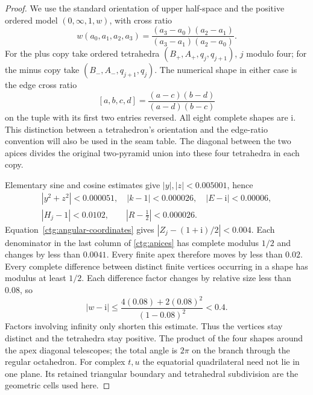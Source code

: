 \documentclass[11pt]{article}
\numberwithin{equation}{section}
\theoremstyle{definition}
\theoremstyle{remark}
\newcommand{\ii}{\mathrm i}
\begin{document}
\begin{proof}
We use the standard orientation of upper half-space and the positive
ordered model $(0,\infty,1,w)$, with cross ratio
\begin{equation}\label{ctg:positive-cross-ratio}
 w(a_0,a_1,a_2,a_3)=
 \frac{(a_3-a_0)(a_2-a_1)}{(a_3-a_1)(a_2-a_0)}.
\end{equation}
For the plus copy take ordered tetrahedra
$(B_+,A_+,q_j,q_{j+1})$, $j$ modulo four; for the minus copy take
$(B_-,A_-,q_{j+1},q_j)$. The numerical shape in either case is the
edge cross ratio
\begin{equation}\label{ctg:edge-ratio}
 [a,b,c,d]=\frac{(a-c)(b-d)}{(a-d)(b-c)}
\end{equation}
on the tuple with its first two entries reversed. All eight complete
shapes are $\ii$. This distinction between a tetrahedron's orientation
and the edge-ratio convention will also be used in the seam table.
The diagonal between the two apices divides the original two-pyramid
union into these four tetrahedra in each copy.

Elementary sine and cosine estimates give
$|y|,|z|<0.005001$, hence
\[
\begin{gathered}
 |y^2+z^2|<0.000051,\quad |k-1|<0.000026,\quad
 |E-\ii|<0.00006,\\
 |H_j-1|<0.0102,\qquad |R-\tfrac12|<0.000026.
\end{gathered}
\]
Equation~\eqref{ctg:angular-coordinates} gives
$|Z_j-(1+\ii)/2|<0.004$. Each denominator in the last column of
\eqref{ctg:apices} has complete modulus $1/2$ and changes by less
than $0.0041$. Every finite apex therefore moves by less than $0.02$.
Every complete difference between distinct finite vertices occurring
in a shape has modulus at least $1/2$. Each difference factor changes
by relative size less than $0.08$, so
\[
 |w-\ii|\le
 \frac{4(0.08)+2(0.08)^2}{(1-0.08)^2}<0.4.
\]
Factors involving infinity only shorten this estimate. Thus the
vertices stay distinct and the tetrahedra stay positive. The product
of the four shapes around the apex diagonal telescopes; the total
angle is $2\pi$ on the branch through the regular octahedron.
For complex $t,u$ the equatorial quadrilateral need not lie in one
plane. Its retained triangular boundary and tetrahedral subdivision
are the geometric cells used here.
\end{proof}
\end{document}
